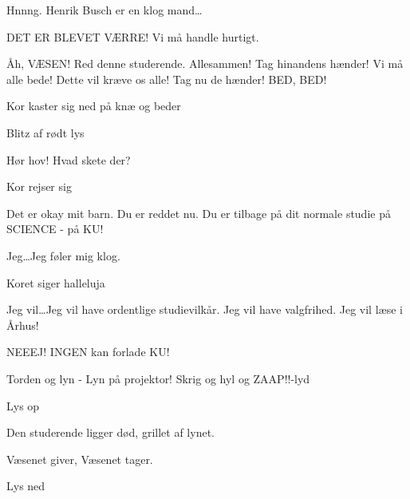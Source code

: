 \documentclass[a4paper,12pt]{article}
\begin{document}
\begin{sketch}
Hnnng. Henrik Busch er en klog mand\ldots

 DET ER BLEVET VÆRRE! Vi må handle hurtigt. 

 Åh, VÆSEN! Red denne studerende. Allesammen! Tag hinandens
hænder! Vi må alle bede! Dette vil kræve os alle! Tag nu de hænder!
BED, BED!

\scene Kor kaster sig ned på knæ og beder

\scene Blitz af rødt lys

 Hør hov! Hvad skete der?

\scene Kor rejser sig

 Det er okay mit barn. Du er reddet nu. Du er tilbage på dit normale studie på SCIENCE - på KU!

 Jeg\ldots Jeg føler mig klog.

\scene Koret siger halleluja

 Jeg vil\ldots Jeg vil have ordentlige studievilkår. Jeg vil have valgfrihed. Jeg vil læse i Århus! 

 NEEEJ! INGEN kan forlade KU!

Torden og lyn - Lyn på projektor! Skrig og hyl og ZAAP!!-lyd

\scene Lys op

\scene Den studerende ligger død, grillet af lynet.

 Væsenet giver, Væsenet tager.

\scene Lys ned



\end{sketch}
\end{document}
